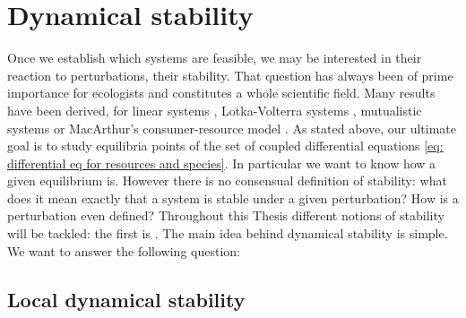 \documentclass[12pt, titlepage]{report}
\begin{document}
\newpage
\section{Dynamical stability}
Once we establish which systems are feasible, we may be interested in their reaction to perturbations, \ie their stability. That question has always been of prime importance for ecologists and constitutes a whole scientific field. Many results have been derived, for linear systems \cite{may_will_1972}, Lotka-Volterra systems \cite{bunin_ecological_2017, takeuchi_global_1996}, mutualistic systems \cite{pascual-garcia_mutualism_2017} or MacArthur's consumer-resource model \cite{chesson_macarthurs_1990}. %
As stated above, %
our ultimate goal is to study equilibria points of the set of coupled differential equations \eqref{eq: differential eq for resources and species}. In particular we want to know how  a given equilibrium is. However there is no consensual definition of stability: what does it mean exactly that a system is stable under a given perturbation? How is a perturbation even defined? %
Throughout this Thesis different notions of stability will be tackled: the first is .
The main idea behind dynamical stability is simple. We want to answer the following question:

\begin{centering}
\end{centering}
\subsection{Local dynamical stability}
\end{document}
